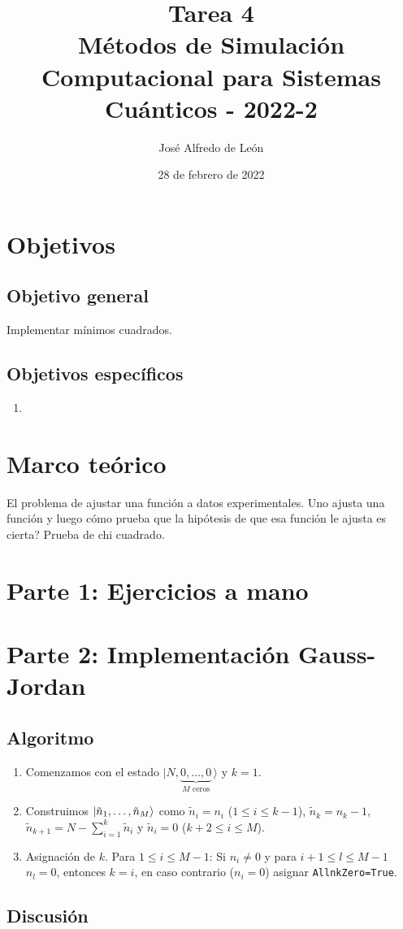 \documentclass[11pt,letterpaper]{article}
\author{José Alfredo de León}
\title{Tarea 4\\
\large{Métodos de Simulación Computacional para Sistemas Cuánticos - 2022-2}}
\begin{document}
\date{28 de febrero de 2022}
\maketitle

\section{Objetivos}
\subsection{Objetivo general}
Implementar mínimos cuadrados.

\subsection{Objetivos específicos}
\begin{enumerate}
\item 
\end{enumerate}

\section{Marco teórico}
El problema de ajustar una función a datos experimentales. Uno ajusta una
función y luego cómo prueba que la hipótesis de que esa función le ajusta
es cierta? Prueba de chi cuadrado.


\section{Parte 1: Ejercicios a mano}


\section{Parte 2: Implementación Gauss-Jordan}


\subsection{Algoritmo}
\begin{enumerate}
\item Comenzamos con el estado $|N,\underbrace{0,\ldots,0}_{M\text{ ceros}}\,\rangle$ y $k=1$.
\item Construimos $\ket{\tilde{n}_1,\ldots,\tilde{n}_M}$ como 
$\tilde{n}_i=n_i$ ($1\leq i\leq k-1$),
$\tilde{n}_k=n_k-1$,
$\tilde{n}_{k+1}=N-\sum_{i=1}^k\tilde{n}_i$ y 
$\tilde{n}_i=0$ ($k+2\leq i\leq M$).
\item Asignación de $k$. Para $1\leq i\leq M-1$: 
Si $n_i\neq 0$ y para $i+1\leq l\leq M-1$ $n_l=0$, entonces $k=i$,  
en caso contrario ($n_i=0$) asignar \verb|AllnkZero=|\verb|True|.
\end{enumerate}


\subsection{Discusión}
\end{document}
